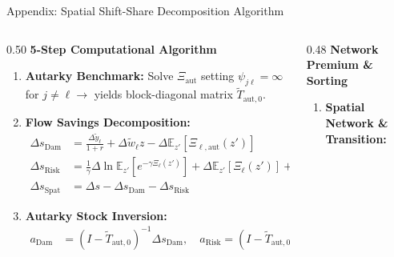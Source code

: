 \documentclass[aspectratio=169, 10pt]{beamer}
\begin{document}
\begin{frame}{Appendix: Spatial Shift-Share Decomposition Algorithm \hfill \hyperlink{main:mechanisms}{\scriptsize{}}}\label{backup:shift_share_algo}
    \begin{columns}[T]
        \begin{column}{0.50\textwidth}
            \textbf{\small 5-Step Computational Algorithm}
            \vspace{0.04cm}
            \begin{enumerate}\scriptsize\setlength{\itemsep}{1.5pt}
                \item \textbf{Autarky Benchmark:} Solve $\Xi_{\text{aut}}$ setting $\psi_{j\ell} = \infty$ for $j \neq \ell \to$ yields block-diagonal matrix $\tilde{T}_{\text{aut},0}$.
                \item \textbf{Flow Savings Decomposition:}
                {\tiny
                \begin{align*}
                \Delta s_{\text{Dam}} &= \tfrac{\Delta \tilde{y}_\ell}{1+r} + \Delta \tilde{w}_\ell z - \Delta \mathbb{E}_{z'}[\Xi_{\ell,\text{aut}}(z')] \\
                \Delta s_{\text{Risk}} &= \tfrac{1}{\gamma}\Delta \ln \mathbb{E}_{z'}[e^{-\gamma \Xi_\ell(z')}] + \Delta \mathbb{E}_{z'}[\Xi_\ell(z')] + \Delta \text{Risk}_{\text{Tr}} \\
                \Delta s_{\text{Spat}} &= \Delta s - \Delta s_{\text{Dam}} - \Delta s_{\text{Risk}}
                \end{align*}
                }
                \item \textbf{Autarky Stock Inversion:}
                {\tiny
                \begin{align*}
                a_{\text{Dam}} &= (I - \tilde{T}_{\text{aut},0})^{-1}\Delta s_{\text{Dam}}, \quad a_{\text{Risk}} = (I - \tilde{T}_{\text{aut},0})^{-1}\Delta s_{\text{Risk}}
                \end{align*}
                }
            \end{enumerate}
        \end{column}
        \begin{column}{0.48\textwidth}
            \textbf{\small Network Premium \& Sorting}
            \vspace{0.04cm}
            \begin{enumerate}\scriptsize\setlength{\itemsep}{1.5pt}
                \setcounter{enumi}{3}
                \item \textbf{Spatial Network \& Transition:}

\end{enumerate}
\end{column}
\end{columns}
\end{frame}
\end{document}
